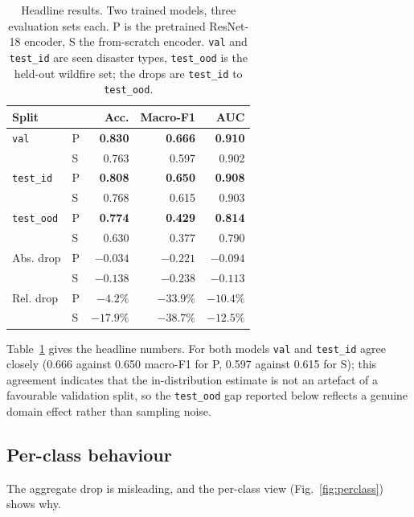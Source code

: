 \documentclass[10pt,twocolumn]{article}
\begin{document}
\begin{table}[t]
\centering
\footnotesize
\caption{Headline results. Two trained models, three evaluation sets each. P is the pretrained
ResNet-18 encoder, S the from-scratch encoder. \texttt{val} and \texttt{test\_id} are seen disaster
types, \texttt{test\_ood} is the held-out wildfire set; the drops are \texttt{test\_id} to
\texttt{test\_ood}.}
\label{tab:main}
\begin{tabular}{@{}llrrr@{}}
\toprule
\textbf{Split} & & \textbf{Acc.} & \textbf{Macro-F1} & \textbf{AUC} \\
\midrule
\texttt{val}       & P & \textbf{0.830} & \textbf{0.666} & \textbf{0.910} \\
                   & S & 0.763 & 0.597 & 0.902 \\
\texttt{test\_id}  & P & \textbf{0.808} & \textbf{0.650} & \textbf{0.908} \\
                   & S & 0.768 & 0.615 & 0.903 \\
\texttt{test\_ood} & P & \textbf{0.774} & \textbf{0.429} & \textbf{0.814} \\
                   & S & 0.630 & 0.377 & 0.790 \\
\midrule
Abs. drop          & P & $-0.034$  & $-0.221$  & $-0.094$ \\
                   & S & $-0.138$  & $-0.238$  & $-0.113$ \\
Rel. drop          & P & $-4.2\%$  & $-33.9\%$ & $-10.4\%$ \\
                   & S & $-17.9\%$ & $-38.7\%$ & $-12.5\%$ \\
\bottomrule
\end{tabular}
\end{table}

Table~\ref{tab:main} gives the headline numbers. For both models \texttt{val} and \texttt{test\_id}
agree closely (0.666 against 0.650 macro-F1 for P, 0.597 against 0.615 for S); this agreement
indicates that the in-distribution estimate is not an artefact of a favourable validation split, so
the \texttt{test\_ood} gap reported below reflects a genuine domain effect rather than sampling
noise.

\subsection{Per-class behaviour}

The aggregate drop is misleading, and the per-class view (Fig.~\ref{fig:perclass}) shows why.
\end{document}
